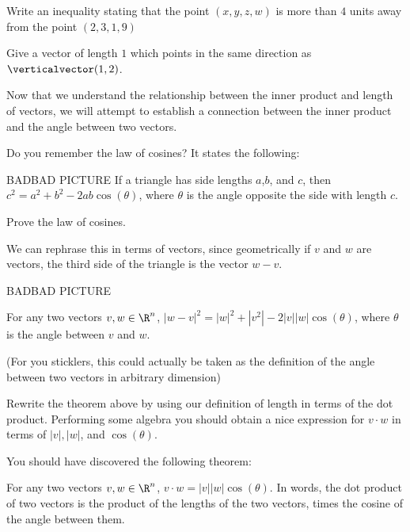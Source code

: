 \begin{question}
	Write an inequality stating that the point $(x,y,z,w)$ is more than $4$ units away from the point $(2,3,1,9)$
\end{question}

\begin{question}
	Give a vector of length $1$ which points in the same direction as $\verticalvector(1,2)$.
\end{question}

Now that we understand the relationship between the inner product and length of vectors, we will attempt to establish a connection between the inner product and the 
angle between two vectors.

Do you remember the law of cosines?  It states the following:

\begin{theorem}
	BADBAD PICTURE
	If a triangle has side lengths $a$,$b$, and $c$, then $c^2 = a^2+b^2 - 2ab\cos(\theta)$, where $\theta$ is the angle opposite the side with length $c$.
\end{theorem}

\begin{question}
Prove the law of cosines.
\end{question}

We can rephrase this in terms of vectors, since geometrically if $v$ and $w$ are vectors, the third side of the triangle is the vector $w-v$.

BADBAD PICTURE

\begin{theorem}
	For any two vectors $v,w \in \R^n$, $|w-v|^2 = |w|^2 +|v^2| - 2|v| |w| \cos(\theta) $, where $\theta$ is the angle between $v$ and $w$.
\end{theorem}

(For you sticklers, this could actually be taken as the definition of the angle between two vectors in arbitrary dimension)

\begin{question}
	Rewrite the theorem above by using our definition of length in terms of the dot product.  Performing some algebra you should obtain a nice expression for $v\cdot w$
	in terms of $|v|, |w|$, and $\cos(\theta)$.
 \end{question}
 
 You should have discovered the following theorem:
 
 \begin{theorem}
 	For any two vectors $v,w \in \R^n$,  $v \cdot w = |v||w|\cos(\theta)$.  In words, the dot product of two vectors is the product of the lengths of the two vectors,
 	times the cosine of the angle between them.
 \end{theorem}
 
